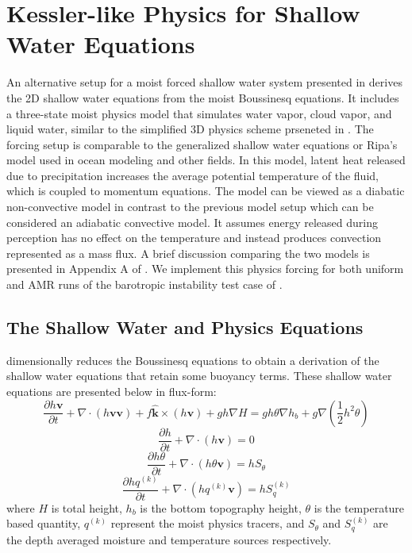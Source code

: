 \section{Kessler-like Physics for Shallow Water Equations}
An alternative setup for a moist forced shallow water system presented in 
\cite{zerroukat2015moist} derives the 2D shallow water equations from 
the moist Boussinesq equations. It includes a three-state moist physics 
model that simulates water vapor, cloud vapor, and liquid water, 
similar to the simplified 3D physics scheme prseneted in 
\cite{kessler1969distribution}. The forcing setup
is comparable to the generalized shallow water equations or Ripa's 
model \citep{ripa1993conservation,ripa1995improving} 
used in ocean modeling and other fields.  
In this model, latent heat released due to precipitation increases 
the average potential temperature of the fluid, which is coupled
to momentum equations.  The model can be viewed as a
diabatic non-convective model in contrast to the previous
model setup which can be considered an adiabatic convective 
model. It assumes energy released during
perception has no effect on the temperature and instead 
produces convection represented as a mass flux. A
brief discussion comparing the two models
is presented in Appendix A of \cite{bouchut2009fronts}.
We implement this physics forcing for both uniform and
AMR runs of the barotropic instability test case of
\cite{galewsky2004initial}.

\subsection{The Shallow Water and Physics Equations}
\cite{zerroukat2015moist} dimensionally reduces the Boussinesq equations 
to obtain a derivation of the shallow water equations that retain some
buoyancy terms. These shallow water equations are presented below in flux-form:
   \begin{equation}
     \label{eq:swkesmom} \frac{\partial h \mathbf{v}}{\partial t} +
     \nabla \cdot (h \mathbf{v} \mathbf{v}) + f \mathbf{\hat{k}}\times(h\mathbf{v}) + gh\nabla H = 
     g h \theta \nabla h_b + g\nabla (\frac{1}{2}h^2\theta)
   \end{equation}
   \begin{equation}
     \label{eq:swkescon}  \frac{\partial h}{\partial t} + \nabla \cdot (h\mathbf{v}) = 0
   \end{equation}
   \begin{equation}
     \label{eq:swthetacon}  \frac{\partial h\theta}{\partial t} + \nabla \cdot (h \theta \mathbf{v}) = hS_\theta
   \end{equation}
   \begin{equation}
     \label{eq:swkesqcon}  \frac{\partial h q^{(k)}}{\partial t} + \nabla \cdot (h  q^{(k)} \mathbf{v}) = hS_q^{(k)}
   \end{equation}
where $H$ is total height, $h_b$ is the bottom topography height, $\theta$ is the temperature based 
quantity, $q^{(k)}$ represent the moist physics tracers, and $S_\theta$ and $S_q^{(k)}$ are 
the depth averaged moisture and temperature sources respectively. 
    

